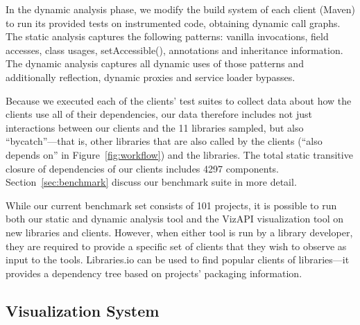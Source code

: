 In the dynamic analysis phase, we modify the build system of each
client (Maven) to run its provided tests on instrumented code,
obtaining dynamic call graphs.  The static analysis captures the
following patterns: vanilla invocations, field accesses, class usages,
setAccessible(), annotations and inheritance information. The dynamic
analysis captures all dynamic uses of those patterns and additionally
reflection, dynamic proxies and service loader bypasses.

Because we executed each of the clients' test suites to collect data about how the clients use all of their dependencies, our data therefore includes not just interactions between our clients and the 11 libraries sampled, but also ``bycatch''---that is, other libraries that are also called by the clients (``also depends on'' in Figure~\ref{fig:workflow}) and the libraries. The total static transitive closure of dependencies of our clients includes 4297 components. Section~\ref{sec:benchmark} discuss our benchmark suite in more detail.

While our current benchmark set consists of 101 projects, it is possible to run both our static and dynamic analysis tool and the VizAPI visualization tool on new libraries and clients. However, when either tool is run by a library developer, they are required to provide a specific set of clients that they wish to observe as input to the tools. Libraries.io can be used to find popular clients of libraries---it provides a dependency tree based on projects' packaging information.


\subsection{Visualization System}
\label{subsec:vis-system}

